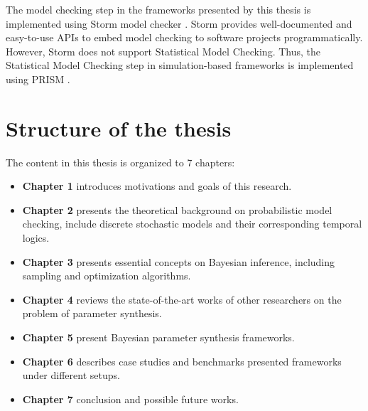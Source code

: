 The model checking step in the frameworks presented by this thesis is implemented using Storm model
checker \cite{hensel2020probabilistic}. Storm provides well-documented and easy-to-use APIs to embed
model checking to software projects programmatically. However, Storm does not support Statistical
Model Checking. Thus, the Statistical Model Checking step in simulation-based frameworks is
implemented using PRISM \cite{kwiatkowska2011prism}.

\section{Structure of the thesis}
The content in this thesis is organized to 7 chapters:
\begin{itemize}
      \item \textbf{Chapter 1} introduces motivations and goals of this research.
      \item \textbf{Chapter 2} presents the theoretical background on probabilistic model checking,
            include discrete stochastic models and their  corresponding temporal logics.
      \item \textbf{Chapter 3} presents essential concepts on Bayesian inference, including sampling
            and optimization algorithms.
      \item \textbf{Chapter 4} reviews the state-of-the-art works of other researchers on the
            problem of parameter synthesis.
      \item \textbf{Chapter 5} present Bayesian parameter synthesis frameworks.
      \item \textbf{Chapter 6} describes case studies and benchmarks presented frameworks under
            different setups.
      \item \textbf{Chapter 7} conclusion and possible future works.
\end{itemize}

